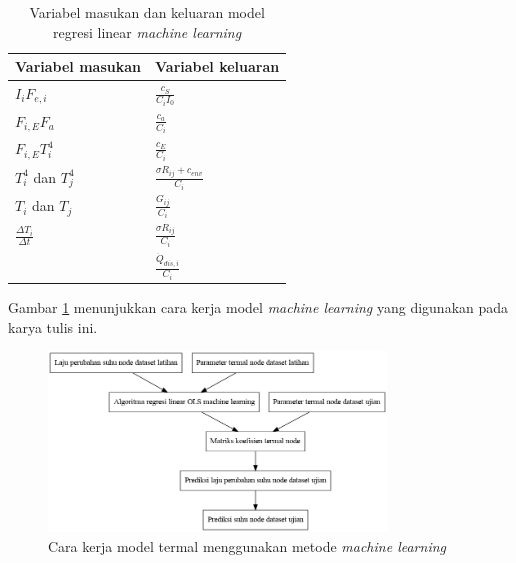 \begin{table}[!ht]
\begin{center}
	\caption{Variabel masukan dan keluaran model regresi linear \textit{machine learning}}
\label{table:inputoutput}
\begin{tabular}{|l|l|}
\hline
Variabel masukan              & Variabel keluaran                     \\ \hline
$I_iF_{e,i}$                  & $\frac{c_S}{C_i I_0}$                 \\ \hline
$F_{i,E}F_a$                  & $\frac{c_a}{C_i}$                     \\ \hline
$F_{i,E}T_i^4$                & $\frac{c_E}{C_i}$                     \\ \hline
$T_i^4$ dan $T_j^4$           & $\frac{\sigma R_{ij} + c_{env}}{C_i}$ \\ \hline
$T_i$ dan $T_j$               & $\frac{G_{ij}}{C_i}$                  \\ \hline
$\frac{\Delta T_i}{\Delta t}$ & $\frac{\sigma R_{ij}}{C_i}$           \\ \hline
                              & $\frac{\dot{Q}_{dis,i}}{C_i}$         \\ \hline
\end{tabular}
\end{center}
\vspace{-5mm}
\end{table}

Gambar \ref{fig:mlsetup} menunjukkan cara kerja model \textit{machine learning}
yang digunakan pada karya tulis ini.

\begin{figure}[H]
\setlength{}
\begin{center}
\includegraphics[width=0.8\textwidth]{fig/graph_mlsetup.png}
	\caption{Cara kerja model termal menggunakan metode \textit{machine learning}}
\label{fig:mlsetup}
\end{center}
\end{figure}

